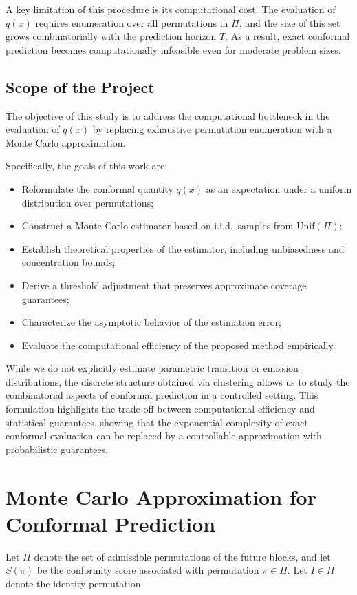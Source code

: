 \documentclass{article}
\begin{document}
A key limitation of this procedure is its computational cost. The evaluation of $q(x)$ requires enumeration over all permutations in $\Pi$, and the size of this set grows combinatorially with the prediction horizon $T$. As a result, exact conformal prediction becomes computationally infeasible even for moderate problem sizes.

\subsection{Scope of the Project}

The objective of this study is to address the computational bottleneck in the evaluation of $q(x)$ by replacing exhaustive permutation enumeration with a Monte Carlo approximation.

Specifically, the goals of this work are:
\begin{itemize}
\item Reformulate the conformal quantity $q(x)$ as an expectation under a uniform distribution over permutations;
\item Construct a Monte Carlo estimator based on i.i.d.\ samples from $\mathrm{Unif}(\Pi)$;
\item Establish theoretical properties of the estimator, including unbiasedness and concentration bounds;
\item Derive a threshold adjustment that preserves approximate coverage guarantees;
\item Characterize the asymptotic behavior of the estimation error;
\item Evaluate the computational efficiency of the proposed method empirically.
\end{itemize}

While we do not explicitly estimate parametric transition or emission distributions, the discrete structure obtained via clustering allows us to study the combinatorial aspects of conformal prediction in a controlled setting.
This formulation highlights the trade-off between computational efficiency and statistical guarantees, showing that the exponential complexity of exact conformal evaluation can be replaced by a controllable approximation with probabilistic guarantees.

\section{Monte Carlo Approximation for Conformal Prediction}

Let $\Pi$ denote the set of admissible permutations of the future blocks, and let $S(\pi)$ be the conformity score associated with permutation $\pi \in \Pi$. Let $I \in \Pi$ denote the identity permutation.
\end{document}
